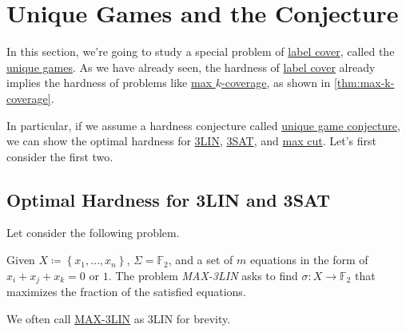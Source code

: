 \chapter{Unique Games and the Conjecture}

In this section, we're going to study a special problem of \hyperref[prb:label-cover]{label cover}, called the \hyperref[prb:unique-game]{unique games}. As we have already seen, the hardness of \hyperref[prb:label-cover]{label cover} already implies the hardness of problems like \hyperref[prb:max-k-coverage]{max \(k\)-coverage}, as shown in \autoref{thm:max-k-coverage}.

In particular, if we assume a hardness conjecture called \hyperref[conj:unique-game]{unique game conjecture}, we can show the optimal hardness for \hyperref[prb:max-3LIN]{3LIN}, \hyperref[prb:max-3SAT]{3SAT}, and \hyperref[prb:max-cut]{max cut}. Let's first consider the first two.

\section{Optimal Hardness for 3LIN and 3SAT}
Let consider the following problem.
\begin{problem}\label{prb:max-3LIN}
Given \(X\coloneqq \left\{ x_1, \dots , x_n  \right\} \), \(\Sigma = \mathbb{F} _2\), and a set of \(m\) equations in the form of \(x_i + x_j + x_k = 0\) or \(1\). The problem \emph{MAX-3LIN} asks to find \(\sigma \colon X\to \mathbb{F} _2\) that maximizes the fraction of the satisfied equations.
\end{problem}

\begin{remark}
	We often call \hyperref[prb:max-3LIN]{MAX-3LIN} as 3LIN for brevity.
\end{remark}

